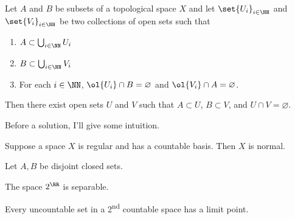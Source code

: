 \documentclass{fkpset}
\begin{document}
\pagestyle{plain}
\pagestyle{fancy}
  \pointstable{}

  \vspace{1cm}

  \begin{problem}
    Let $A$ and $B$ be subsets of a topological space $X$ and let
    $\set{U_i}_{i \in \NN}$ and $\set{V_i}_{i \in \NN}$ be two
    collections of open sets such that
    \begin{enumerate}[label=(\arabic*)]
      \item $A \subset \bigcup_{i \in \NN} U_i$
      \item $B \subset \bigcup_{i \in \NN} V_i$
      \item For each $i \in \NN$, $\ol{U_i} \cap B = \varnothing$ and
        $\ol{V_i} \cap A = \varnothing$.
    \end{enumerate}
    Then there exist open sets $U$ and $V$ such that $A \subset U$, $B
    \subset V$, and $U \cap V = \varnothing$.
  \end{problem}
  \begin{leftbar}
    Before a solution, I'll give some intuition.


  \end{leftbar}
  \begin{solution}

  \end{solution}
  \clearpage


  \begin{problem}[5.32]
    Suppose a space $X$ is regular and has a countable basis. Then $X$
    is normal.
  \end{problem}
  \begin{solution}
    Let $A,B$ be disjoint closed sets.
  \end{solution}
  \clearpage

  \begin{problem}[6.6]
    The space $2^\RR$ is separable.
  \end{problem}
  \begin{solution}
  \end{solution}
  \clearpage

  \begin{problem}[6.11]
    Every uncountable set in a 2\textsuperscript{nd} countable space
    has a limit point.
  \end{problem}
  \begin{solution}
  \end{solution}
  \clearpage
\end{document}
